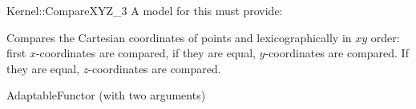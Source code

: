 \begin{ccRefFunctionObjectConcept}{Kernel::CompareXYZ_3}
A model for this must provide:


      {Compares the Cartesian coordinates of points  and
        lexicographically in $xy$ order: first 
       $x$-coordinates are compared, if they are equal, $y$-coordinates
       are compared. If they are equal, $z$-coordinates are compared.}

\ccRefines
AdaptableFunctor (with two arguments)

\ccSeeAlso
{} \\

\end{ccRefFunctionObjectConcept}
